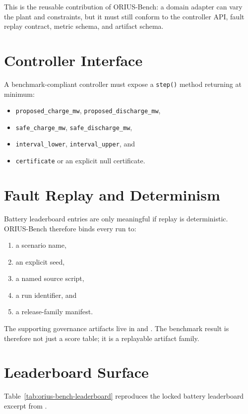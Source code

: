 This is the reusable contribution of ORIUS-Bench: a domain adapter can vary
the plant and constraints, but it must still conform to the controller API,
fault replay contract, metric schema, and artifact schema.

\section{Controller Interface}

A benchmark-compliant controller must expose a \texttt{step()} method
returning at minimum:
\begin{itemize}
  \item \texttt{proposed\_charge\_mw}, \texttt{proposed\_discharge\_mw},
  \item \texttt{safe\_charge\_mw}, \texttt{safe\_discharge\_mw},
  \item \texttt{interval\_lower}, \texttt{interval\_upper}, and
  \item \texttt{certificate} or an explicit null certificate.
\end{itemize}

\section{Fault Replay and Determinism}

Battery leaderboard entries are only meaningful if replay is deterministic.
ORIUS-Bench therefore binds every run to:

\begin{enumerate}
  \item a scenario name,
  \item an explicit seed,
  \item a named source script,
  \item a run identifier, and
  \item a release-family manifest.
\end{enumerate}

The supporting governance artifacts live in
 and
.  The benchmark result is
therefore not just a score table; it is a replayable artifact family.

\section{Leaderboard Surface}

Table~\ref{tab:orius-bench-leaderboard} reproduces the locked battery
leaderboard excerpt from
.

